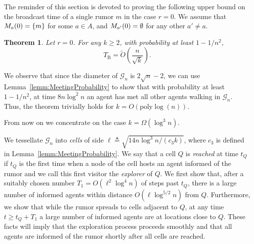 \documentclass[11pt]{article}
\newcommand{\newterm}[1]{\emph{#1}}
\newcommand{\bigO}[1]{O\left(#1\right)}
\newcommand{\bigOt}[1]{\tilde{O}\left(#1\right)}
\newcommand{\bigTh}[1]{\Theta\left(#1\right)}
\newcommand{\bigOm}[1]{\Omega\left(#1\right)}
\newcommand{\bt}{T_{\mathrm{B}}}
\newcommand{\gt}{T_{\mathrm{G}}}
\newcommand{\grid}{\mathcal{G}_n}
\newtheorem{theo}{Theorem}
\begin{document}
The reminder of this section is devoted to proving the following upper
bound on the broadcast time of a single rumor $m$ in the case $r=0$.
We assume that  $M_{a}(0) = \{m\}$ for some $a \in A$,
and $M_{a'}(0) = \emptyset$ for any other $a' \neq a$.
\begin{theo}
\label{theo:UBSpreadingTime2}
Let $r = 0$. For any $k \geq 2$, with probability at least $1-1/n^2$,
\[
	\bt = \bigOt{\frac{n}{\sqrt{k}}}.
\]
\end{theo}

We observe that since the diameter of $\grid$ is $2\sqrt{n} - 2$,
we can use Lemma~\ref{lemm:MeetingProbability} to show that
with probability at least $1-1/n^2$, at time $8 n \log^2 n$
an agent  has met all other agents walking   in $\grid$.
Thus, the theorem trivially holds for $k = \bigO{\mbox{poly}\log(n)}$.

From now on we concentrate on the case $k=\bigOm{\log^3 n}$.
	\iffalse
	Albeit our reference scenario is defined with respect to a fixed number $k$
	of agents (the \newterm{exact model}), technically, it is easier to
	derive an upper bound on $\gt$ using a slightly modified model in
	which, initially, each grid node $v$ holds $K_v$ agents, where $K_v$
	is binomial random variable with distribution $B(k,1/n)$, and the
	$K_v$'s are mutually independent (the \newterm{binomial model}). We
	refer to $k/n = E[K_v]$ as the \newterm{density} of the binomial
	model, and let $\tilde{K} = \sum_v K_v$ be the random variable
	denoting the number of agents in a given instance of the model.  For
	sufficiently large density, namely $k = \bigOm{\log n}$, a standard
	argument based on Chernoff bound, shows that $\tilde{K}=\bigTh{k}$,
	with high probability.  Then, by
	\cite[Corollary~5.9]{MitzenmacherU05}, a high-probability result for
	the binomial model with $k = \bigOm{\log n}$ implies a similar
	high-probability result in the exact model with $k$ agents.
	
	The argument proceeds as follows.
	\fi
We tessellate $\grid$ into
\newterm{cells} of side $\ell \triangleq \sqrt{{14 n \log^3 n}/{(c_3 k){}}}$,
where $c_3$ is defined in Lemma~\ref{lemm:MeetingProbability}.
We say that a cell $Q$ is
\newterm{reached} at time $t_Q$ if $t_Q$ is the first time when a node
of the cell hosts an agent informed of the rumor and we call this first
visitor the \newterm{explorer} of $Q$.
We first show that, after a suitably
chosen number $T_1 = \bigO{\ell^2 \log^4 n}$ of steps past $t_Q$,
there is a large number of informed agents 
within distance $\bigO{\ell \log^{5/2} n}$ from $Q$.
Furthermore, we show that while the rumor spreads to cells
adjacent to $Q$, at any time $t \geq t_Q + T_1$ a large number of
informed agents are at locations close to $Q$.
These facts will imply that
the exploration process proceeds smoothly and that all agents are
informed of the rumor shortly after all cells are reached.
\end{document}

